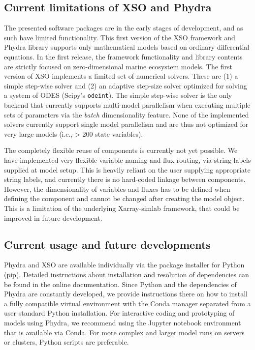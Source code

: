\documentclass[journal abbreviation, manuscript]{copernicus}
\begin{document}
\subsection{Current limitations of XSO and Phydra}

The presented software packages are in the early stages of development, and as such have limited functionality. This first version of the XSO framework and Phydra library supports only mathematical models based on ordinary differential equations. In the first release, the framework functionality and library contents are strictly focused on zero-dimensional marine ecosystem models.
The first version of XSO implements a limited set of numerical solvers. These are (1) a simple step-wise solver and (2) an adaptive step-size solver optimized for solving a system of ODES (Scipy's \texttt{odeint}). The simple step-wise solver is the only backend that currently supports multi-model parallelism when executing multiple sets of parameters via the \textit{batch} dimensionality feature. None of the implemented solvers currently support single model parallelism and are thus not optimized for very large models (i.e., > 200 state variables).

The completely flexible reuse of components is currently not yet possible. We have implemented very flexible variable naming and flux routing, via string labels supplied at model setup. This is heavily reliant on the user supplying appropriate string labels, and currently there is no hard-coded linkage between components. However, the dimensionality of variables and fluxes has to be defined when defining the component and cannot be changed after creating the model object. This is a limitation of the underlying Xarray-simlab framework, that could be improved in future development.

\subsection{Current usage and future developments}

Phydra and XSO are available individually via the package installer for Python (pip). Detailed instructions about installation and resolution of dependencies can be found in the online documentation. Since Python and the dependencies of Phydra are constantly developed, we provide instructions there on how to install a fully compatible virtual environment with the Conda manager separated from a user standard Python installation. For interactive coding and prototyping of models using Phydra, we recommend using the Jupyter notebook environment that is available via Conda. For more complex and larger model runs on servers or clusters, Python scripts are preferable.
\end{document}
